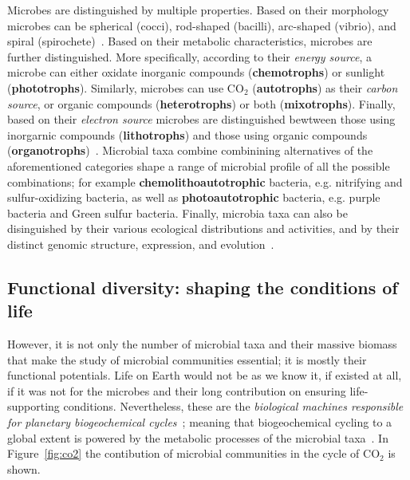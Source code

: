       Microbes are distinguished by multiple properties.
      Based on their morphology microbes can be spherical (cocci), rod-shaped (bacilli),
      arc-shaped (vibrio), and spiral (spirochete)~\cite{dunlap2001microbial}.
      Based on their metabolic characteristics, microbes are further distinguished. 
      More specifically, according to their \textit{energy source}, a microbe
      can either oxidate inorganic compounds (\textbf{chemotrophs}) or sunlight (\textbf{phototrophs}).
      Similarly, microbes can use CO$_2$ (\textbf{autotrophs}) as their \textit{carbon source},
      or organic compounds (\textbf{heterotrophs}) or both (\textbf{mixotrophs}).
      Finally, based on their \textit{electron source} 
      microbes are distinguished bewtween those using inorgarnic compounds (\textbf{lithotrophs}) and those using organic compounds (\textbf{organotrophs})~\cite{madigan2018brock}.
      Microbial taxa combine combinining alternatives of the aforementioned categories 
      shape a range of microbial profile of all the possible combinations; for example      \textbf{chemolithoautotrophic} bacteria, 
      e.g. nitrifying and sulfur-oxidizing bacteria, as well
      as \textbf{photoautotrophic} bacteria, 
      e.g. purple bacteria and Green sulfur bacteria. 
      Finally, microbia taxa can also be disinguished by their various ecological distributions and activities, 
      and by their distinct genomic structure, expression, and evolution~\cite{dunlap2001microbial}. 

   \subsection{Functional diversity: shaping the conditions of life}
   \label{subsec:functional_diversity}
      However, it is not only the number of microbial taxa and their massive biomass that
      make the study of microbial communities essential; 
      it is mostly their functional potentials. 
      Life on Earth would not be as we know it, if existed at all, if it was not for the 
      microbes and their long contribution on ensuring life-supporting conditions. 
      Nevertheless, these are the \textit{biological machines responsible for planetary
      biogeochemical cycles}~\cite{falkowski2008microbial}; meaning that biogeochemical cycling 
      to a global extent
      is powered by the metabolic processes of the microbial taxa~\cite{louca2016decoupling}. 
      In Figure~\ref{fig:co2} the contibution of microbial communities 
      in the cycle of CO$_2$ is shown. 

